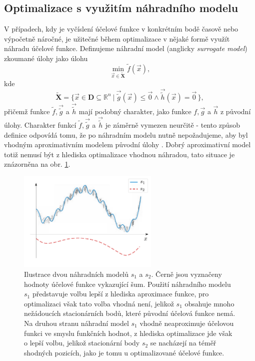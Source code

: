 \subsection{Optimalizace s využitím náhradního modelu}\label{model-based}
V případech, kdy je vyčíslení účelové funkce v konkrétním bodě časově nebo výpočetně  náročné, je užitečné během optimalizace v nějaké formě využít náhradu účelové funkce. Definujeme náhradní model (anglicky \textit{surrogate model}) zkoumané úlohy jako úlohu
\begin{equation}
	\min_{\vec{x} \in \mathbf{\tilde{X}}} \tilde{f}(\vec{x}),
\end{equation}
kde
\begin{equation}
	\mathbf{\tilde{X}} = \big\{ \vec{x} \in \mathbf{D} \subseteq \mathbb{R}^n \ | \ \vec{\tilde{g}} (\vec{x}) \leq \vec{0} \wedge \vec{\tilde{h}} (\vec{x}) = \vec{0} \, \big\},
\end{equation}
přičemž funkce $ \tilde{f}, \vec{\tilde{g}}$ a $ \vec{\tilde{h}} $ mají podobný charakter, jako funkce $ f, \vec{g} $ a $ \vec{h}$ z původní úlohy. Charakter funkcí $ \tilde{f}, \vec{\tilde{g}}$ a $ \vec{\tilde{h}} $ je záměrně vymezen neurčitě - tento způsob definice odpovídá tomu, že po náhradním modelu nutně nepožadujeme, aby byl vhodným aproximativním modelem původní úlohy \cite{two-decades, BBO-textbook, Kramer2011}. Dobrý aproximativní model totiž nemusí být z hlediska optimalizace vhodnou náhradou, tato situace je znázorněna na obr. \ref{fig:surrogate}.

\begin{figure}[H]
	\centering
	\includegraphics[width=0.6\textwidth]{figures/surrogate.pdf}
	\caption{Ilustrace dvou náhradních modelů $ s_1 $ a $ s_2 $. Černě jsou vyznačeny hodnoty účelové funkce vykazující šum. Použití náhradního modelu $ s_1 $ představuje volbu lepší z hlediska aproximace funkce, pro optimalizaci však tato volba vhodná není, jelikož $ s_1 $ obsahuje mnoho nežádoucích stacionárních bodů, které původní účelová funkce nemá. Na druhou stranu náhradní model $ s_1$ vhodně neaproximuje účelovou funkci ve smyslu funkčních hodnot, z hlediska optimalizace jde však o lepší volbu, jelikož stacionární body $ s_2$ se nacházejí na téměř shodných pozicích, jako je tomu u optimalizované účelové funkce.}
	\label{fig:surrogate}
\end{figure}

